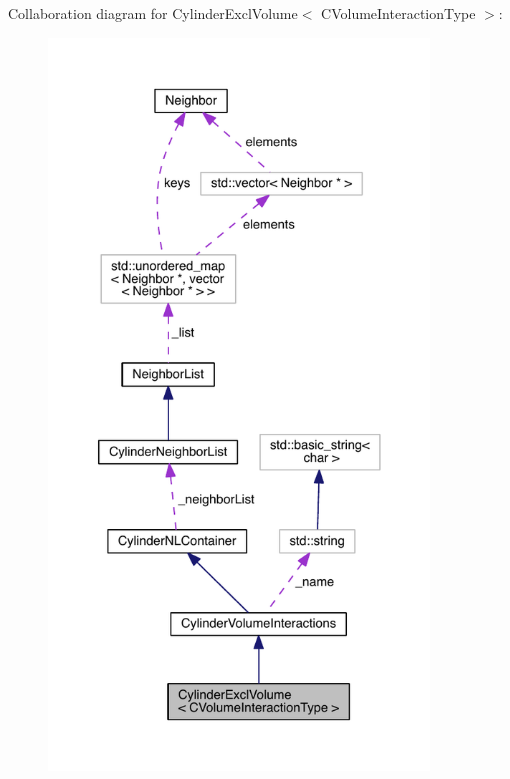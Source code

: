 Collaboration diagram for Cylinder\+Excl\+Volume$<$ C\+Volume\+Interaction\+Type $>$\+:\nopagebreak
\begin{figure}[H]
\begin{center}
\leavevmode
\includegraphics[height=550pt]{classCylinderExclVolume__coll__graph}
\end{center}
\end{figure}
